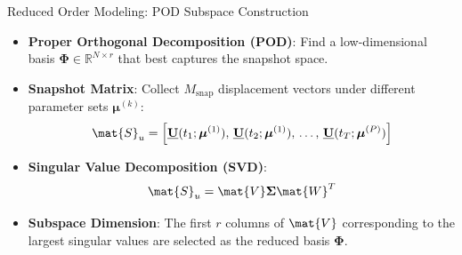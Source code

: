 \begin{frame}{Reduced Order Modeling: POD Subspace Construction}
    \begin{itemize}
        \item \textbf{Proper Orthogonal Decomposition (POD)}: Find a low-dimensional basis $\boldsymbol{\Phi} \in \mathbb{R}^{N \times r}$ that best captures the snapshot space.
        \item \textbf{Snapshot Matrix}: Collect $M_{\text{snap}}$ displacement vectors under different parameter sets $\boldsymbol{\mu}^{(k)}$:
        \begin{equation*}
            \mat{S}_u = \left[ \underline{\mathbf{U}}(t_1; \boldsymbol{\mu}^{(1)}), \, \underline{\mathbf{U}}(t_2; \boldsymbol{\mu}^{(1)}), \, \dots, \, \underline{\mathbf{U}}(t_T; \boldsymbol{\mu}^{(P)}) \right]
        \end{equation*}
        \item \textbf{Singular Value Decomposition (SVD)}:
        \begin{equation*}
            \mat{S}_u = \mat{V} \boldsymbol{\Sigma} \mat{W}^T
        \end{equation*}
        \item \textbf{Subspace Dimension}: The first $r$ columns of $\mat{V}$ corresponding to the largest singular values are selected as the reduced basis $\boldsymbol{\Phi}$.
    \end{itemize}
\end{frame}

